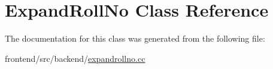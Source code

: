 \hypertarget{classExpandRollNo}{\section{Expand\-Roll\-No Class Reference}
\label{classExpandRollNo}
}


The documentation for this class was generated from the following file\-:\begin{DoxyCompactItemize}
\item 
frontend/src/backend/\hyperlink{expandrollno_8cc}{expandrollno.\-cc}\end{DoxyCompactItemize}
